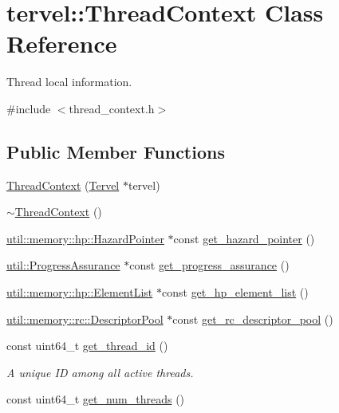\hypertarget{classtervel_1_1_thread_context}{}\section{tervel\+:\+:Thread\+Context Class Reference}
\label{classtervel_1_1_thread_context}


Thread local information.  




{\ttfamily \#include $<$thread\+\_\+context.\+h$>$}

\subsection*{Public Member Functions}
\begin{DoxyCompactItemize}
\item 
\hyperlink{classtervel_1_1_thread_context_ad721aa4ac6705923d8559444ca44a1c8}{Thread\+Context} (\hyperlink{classtervel_1_1_tervel}{Tervel} $\ast$tervel)
\item 
\hyperlink{classtervel_1_1_thread_context_a795e72564606c1d81d4be2f9b505525c}{$\sim$\+Thread\+Context} ()
\item 
\hyperlink{classtervel_1_1util_1_1memory_1_1hp_1_1_hazard_pointer}{util\+::memory\+::hp\+::\+Hazard\+Pointer} $\ast$const \hyperlink{classtervel_1_1_thread_context_a55fae753db46b07ba743b84e56b1396c}{get\+\_\+hazard\+\_\+pointer} ()
\item 
\hyperlink{classtervel_1_1util_1_1_progress_assurance}{util\+::\+Progress\+Assurance} $\ast$const \hyperlink{classtervel_1_1_thread_context_ac25a0709805f33804c1f1093b18d3282}{get\+\_\+progress\+\_\+assurance} ()
\item 
\hyperlink{classtervel_1_1util_1_1memory_1_1hp_1_1_element_list}{util\+::memory\+::hp\+::\+Element\+List} $\ast$const \hyperlink{classtervel_1_1_thread_context_aafee44442237351bb3644cfe43dcbca8}{get\+\_\+hp\+\_\+element\+\_\+list} ()
\item 
\hyperlink{classtervel_1_1util_1_1memory_1_1rc_1_1_descriptor_pool}{util\+::memory\+::rc\+::\+Descriptor\+Pool} $\ast$const \hyperlink{classtervel_1_1_thread_context_aa6b07257c8e434718b67cf2acf4bf947}{get\+\_\+rc\+\_\+descriptor\+\_\+pool} ()
\item 
const uint64\+\_\+t \hyperlink{classtervel_1_1_thread_context_a6fd725c30af483506cd43ea06606886e}{get\+\_\+thread\+\_\+id} ()
\begin{DoxyCompactList}\small\item\em A unique I\+D among all active threads. \end{DoxyCompactList}\item 
const uint64\+\_\+t \hyperlink{classtervel_1_1_thread_context_a8165e74716c2b2a04251565c0d734254}{get\+\_\+num\+\_\+threads} ()
\end{DoxyCompactItemize}
